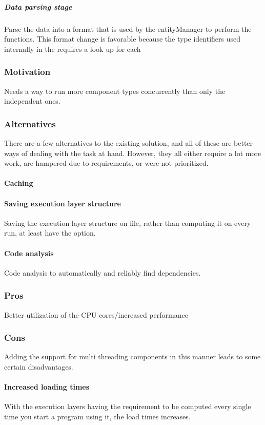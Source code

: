 \subparagraph{Data parsing stage}
Parse the data into a format that is used by the entityManager to perform the functions.
This format change is favorable because the type identifiers used internally in the requires a look up for each


\subsubsection{Motivation}
Needs a way to run more component types concurrently than only the independent ones.


\subsubsection{Alternatives}
There are a few alternatives to the existing solution, and all of these are better ways of dealing with the task at hand.
However, they all either require a lot more work, are hampered due to requirements, or were not prioritized.

\paragraph{Caching}

\paragraph{Saving execution layer structure}
Saving the execution layer structure on file, rather than computing it on every run, at least have the option.

\paragraph{Code analysis}
Code analysis to automatically and reliably find dependencies.

\subsubsection{Pros}
Better utilization of the CPU cores/increased performance


\subsubsection{Cons}
Adding the support for multi threading components in this manner leads to some certain disadvantages.

\paragraph{Increased loading times}
With the execution layers having the requirement to be computed every single time you start a program using it, the load times increases.

